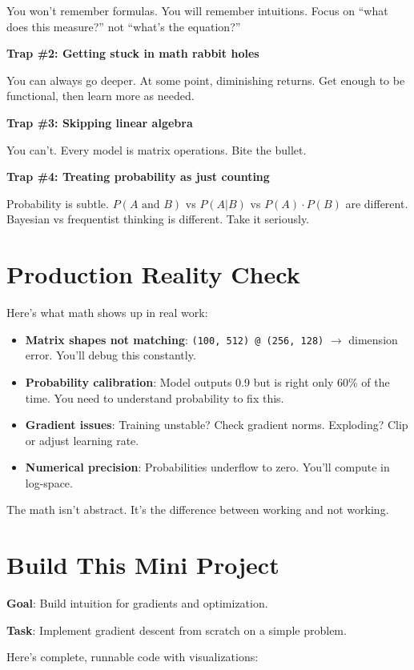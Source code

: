 \documentclass[11pt,oneside]{book}
\begin{document}
You won't remember formulas. You will remember intuitions. Focus on ``what does this measure?'' not ``what's the equation?''

\textbf{Trap \#2: Getting stuck in math rabbit holes}

You can always go deeper. At some point, diminishing returns. Get enough to be functional, then learn more as needed.

\textbf{Trap \#3: Skipping linear algebra}

You can't. Every model is matrix operations. Bite the bullet.

\textbf{Trap \#4: Treating probability as just counting}

Probability is subtle. $P(A \text{ and } B)$ vs $P(A|B)$ vs $P(A) \cdot P(B)$ are different. Bayesian vs frequentist thinking is different. Take it seriously.

\section{Production Reality Check}

Here's what math shows up in real work:

\begin{itemize}
\item \textbf{Matrix shapes not matching}: \texttt{(100, 512) @ (256, 128)} $\rightarrow$ dimension error. You'll debug this constantly.
\item \textbf{Probability calibration}: Model outputs 0.9 but is right only 60\% of the time. You need to understand probability to fix this.
\item \textbf{Gradient issues}: Training unstable? Check gradient norms. Exploding? Clip or adjust learning rate.
\item \textbf{Numerical precision}: Probabilities underflow to zero. You'll compute in log-space.
\end{itemize}

The math isn't abstract. It's the difference between working and not working.

\section{Build This Mini Project}

\textbf{Goal}: Build intuition for gradients and optimization.

\textbf{Task}: Implement gradient descent from scratch on a simple problem.

Here's complete, runnable code with visualizations:
\end{document}
